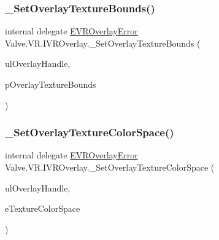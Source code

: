 \mbox{\label{struct_valve_1_1_v_r_1_1_i_v_r_overlay_a08630b9ab7638afe9502371ca7440300}} 
\subsubsection{\texorpdfstring{\_SetOverlayTextureBounds()}{\_SetOverlayTextureBounds()}}
{\footnotesize\ttfamily internal delegate \mbox{\hyperlink{namespace_valve_1_1_v_r_aaee5c5144f42b7969d45b854f51b0c18}{E\+V\+R\+Overlay\+Error}} Valve.\+V\+R.\+I\+V\+R\+Overlay.\+\_\+\+Set\+Overlay\+Texture\+Bounds (\begin{DoxyParamCaption}\item[{ulong}]{ul\+Overlay\+Handle,  }\item[{ref \mbox{\hyperlink{struct_valve_1_1_v_r_1_1_v_r_texture_bounds__t}{V\+R\+Texture\+Bounds\+\_\+t}}}]{p\+Overlay\+Texture\+Bounds }\end{DoxyParamCaption})}

\mbox{\label{struct_valve_1_1_v_r_1_1_i_v_r_overlay_adedd3e23f701f36634b7d6a228ec03e2}} 
\subsubsection{\texorpdfstring{\_SetOverlayTextureColorSpace()}{\_SetOverlayTextureColorSpace()}}
{\footnotesize\ttfamily internal delegate \mbox{\hyperlink{namespace_valve_1_1_v_r_aaee5c5144f42b7969d45b854f51b0c18}{E\+V\+R\+Overlay\+Error}} Valve.\+V\+R.\+I\+V\+R\+Overlay.\+\_\+\+Set\+Overlay\+Texture\+Color\+Space (\begin{DoxyParamCaption}\item[{ulong}]{ul\+Overlay\+Handle,  }\item[{\mbox{\hyperlink{namespace_valve_1_1_v_r_aeb0fba37ba28d8ca276d7c10f01809ac}{E\+Color\+Space}}}]{e\+Texture\+Color\+Space }\end{DoxyParamCaption})}

\mbox{\label{struct_valve_1_1_v_r_1_1_i_v_r_overlay_a3c03a5b1bb15a5be4bc66a4cfeea8ebb}} 
